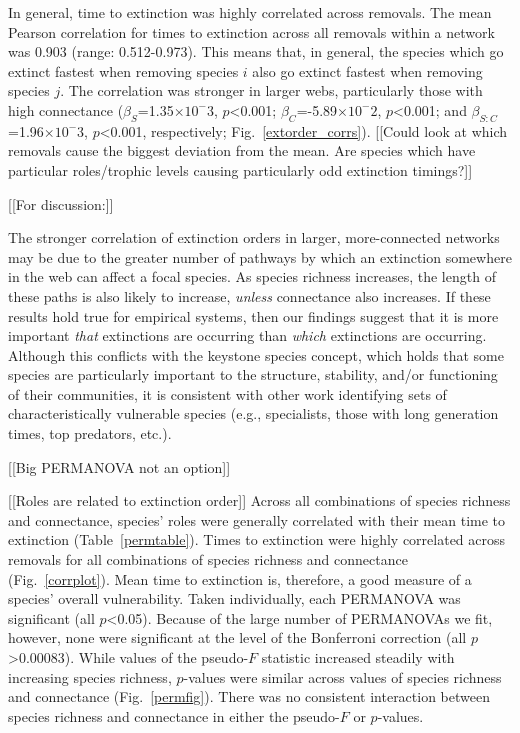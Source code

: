 \documentclass[12pt]{article}
\begin{document}
		In general, time to extinction was highly correlated across removals. The mean Pearson correlation for times to extinction across all removals within a network was 0.903 (range: 0.512-0.973). This means that, in general, the species which go extinct fastest when removing species $i$ also go extinct fastest when removing species $j$. The correlation was stronger in larger webs, particularly those with high connectance ($\beta_{S}$=1.35$\times10^-3$, $p$\textless0.001; $\beta_{C}$=-5.89$\times10^-2$, $p$\textless0.001; and $\beta_{S:C}$=1.96$\times10^-3$, $p$\textless0.001, respectively; Fig.~\ref{extorder_corrs}). 
		[[Could look at which removals cause the biggest deviation from the mean. Are species which have particular roles/trophic levels causing particularly odd extinction timings?]]

		[[For discussion:]]

		The stronger correlation of extinction orders in larger, more-connected networks may be due to the greater number of pathways by which an extinction somewhere in the web can affect a focal species. As species richness increases, the length of these paths is also likely to increase, \emph{unless} connectance also increases. If these results hold true for empirical systems, then our findings suggest that it is more important \emph{that} extinctions are occurring than \emph{which} extinctions are occurring. Although this conflicts with the keystone species concept, which holds that some species are particularly important to the structure, stability, and/or functioning of their communities, it is consistent with other work identifying sets of characteristically vulnerable species (e.g., specialists, those with long generation times, top predators, etc.).



		[[Big PERMANOVA not an option]]


		[[Roles are related to extinction order]]
		Across all combinations of species richness and connectance, species' roles were generally correlated with their mean time to extinction (Table~\ref{permtable}). Times to extinction were highly correlated across removals for all combinations of species richness and connectance (Fig.~\ref{corrplot}). Mean time to extinction is, therefore, a good measure of a species' overall vulnerability. Taken individually, each PERMANOVA was significant (all $p$\textless0.05). Because of the large number of PERMANOVAs we fit, however, none were significant at the level of the Bonferroni correction (all $p$\textgreater0.00083). While values of the pseudo-$F$ statistic increased steadily with increasing species richness, $p$-values were similar across values of species richness and connectance (Fig.~\ref{permfig}). There was no consistent interaction between species richness and connectance in either the pseudo-$F$ or $p$-values.
\end{document}
